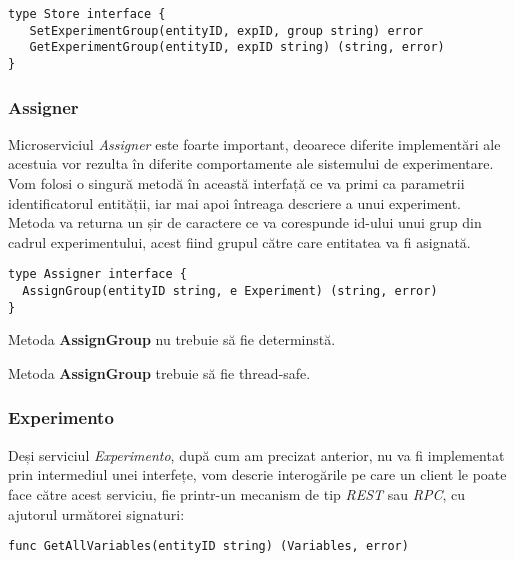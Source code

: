 \begin{center}
	\begin{lstlisting}[language=proto3]
type Store interface {
   SetExperimentGroup(entityID, expID, group string) error
   GetExperimentGroup(entityID, expID string) (string, error)
}
	\end{lstlisting}
\end{center}

\subsubsection{Assigner}

Microserviciul \textit{Assigner} este foarte important, deoarece diferite implementări ale acestuia vor rezulta în diferite comportamente ale sistemului de experimentare. Vom folosi o singură metodă în această interfață ce va primi ca parametrii identificatorul entității, iar mai apoi întreaga descriere a unui experiment. Metoda va returna un șir de caractere ce va corespunde id-ului unui grup din cadrul experimentului, acest fiind grupul către care entitatea va fi asignată.

\begin{center}
	\begin{lstlisting}[language=proto3]
type Assigner interface {
  AssignGroup(entityID string, e Experiment) (string, error)
}
	\end{lstlisting}
\end{center}

\begin{remark}
	Metoda \textbf{AssignGroup} nu trebuie să fie determinstă.
\end{remark}

\begin{remark}
	Metoda \textbf{AssignGroup} trebuie să fie thread-safe.
\end{remark}

\subsubsection{Experimento}

Deși serviciul \textit{Experimento}, după cum am precizat anterior, nu va fi implementat prin intermediul unei interfețe, vom descrie interogările pe care un client le poate face către acest serviciu, fie printr-un mecanism de tip \textit{REST} sau \textit{RPC}, cu ajutorul următorei signaturi:

\begin{center}
	\begin{lstlisting}[language=proto3]
func GetAllVariables(entityID string) (Variables, error)
	\end{lstlisting}
\end{center}

